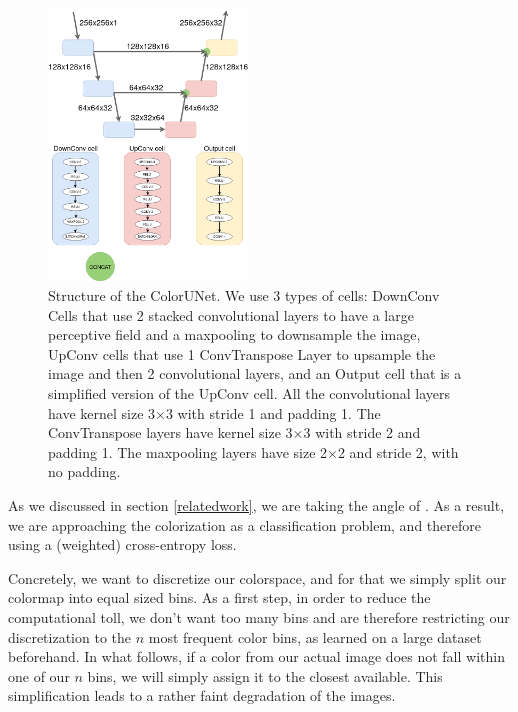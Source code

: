 \documentclass[10pt,twocolumn,letterpaper]{article}
\begin{document}
\begin{figure}
\begin{center}
\includegraphics[width=200px]{diagram}
\caption{Structure of the ColorUNet. We use 3 types of cells: DownConv Cells that use 2 stacked convolutional layers to have a large perceptive field and a maxpooling to downsample the image, UpConv cells that use 1 ConvTranspose Layer to upsample the image and then 2 convolutional layers, and an Output cell that is a simplified version of the UpConv cell. All the convolutional layers have kernel size 3$\times$3  with stride 1 and padding 1. The ConvTranspose layers have kernel size 3$\times$3 with stride 2 and padding 1. The maxpooling layers have size 2$\times$2 and stride 2, with no padding. }
\label{structure}
\end{center}
\end{figure}
As we discussed in section \ref{relatedwork}, we are taking the angle of \cite{zhang2016colorful}. As a result, we are approaching the colorization as a classification problem, and therefore using a (weighted) cross-entropy loss.

Concretely, we want to discretize our colorspace, and for that we simply split our colormap into equal sized bins. As a first step, in order to reduce the computational toll, we don't want too many bins and are therefore restricting our discretization to the $n$ most frequent color bins, as learned on a large dataset beforehand. In what follows, if a color from our actual image does not fall within one of our $n$ bins, we will simply assign it to the closest available. This simplification leads to a rather faint degradation of the images.
\end{document}
